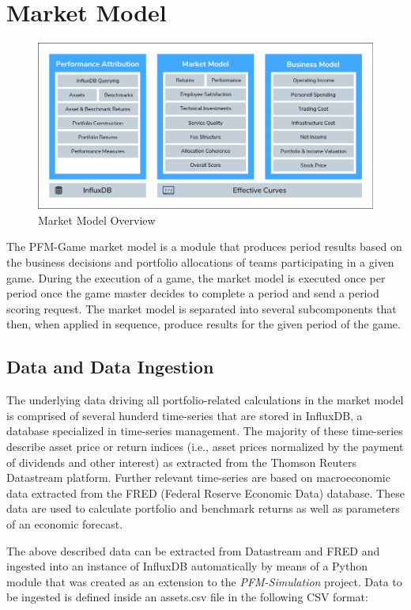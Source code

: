 \section{Market Model}

\begin{figure}[h!]
  \includegraphics[width=\textwidth]{img/market_model.png}
  \caption{Market Model Overview}
  \centering
  \label{fig:market_model_overview}
\end{figure}

The PFM-Game market model is a module that produces period results based on the business decisions and portfolio allocations of teams participating in a given game. During the execution of a game, the market model is executed once per period once the game master decides to complete a period and send a period scoring request. The market model is separated into several subcomponents that then, when applied in sequence, produce results for the given period of the game.

\subsection{Data and Data Ingestion}
The underlying data driving all portfolio-related calculations in the market model is comprised of several hunderd time-series that are stored in InfluxDB, a database specialized in time-series management. The majority of these time-series describe asset price or return indices (i.e., asset prices normalized by the payment of dividends and other interest) as extracted from the Thomson Reuters Datastream platform. Further relevant time-series are based on macroeconomic data extracted from the FRED (Federal Reserve Economic Data) database. These data are used to calculate portfolio and benchmark returns as well as parameters of an economic forecast.

The above described data can be extracted from Datastream and FRED and ingested into an instance of InfluxDB automatically by means of a Python module that was created as an extension to the \textit{PFM-Simulation} project. Data to be ingested is defined inside an assets.csv file in the following CSV format:

